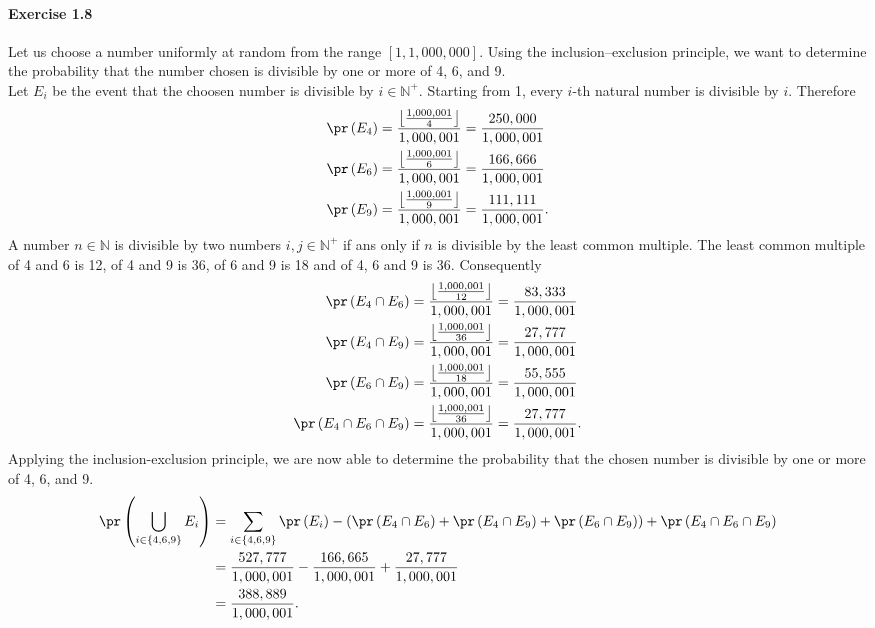 \paragraph{Exercise 1.8} Let us choose a number uniformly at random from the range
$[1, 1,000,000]$. Using the inclusion–exclusion principle, we want to determine
the probability that the number chosen is divisible by one or more of 4, 6, and 9. \\
Let $E_i$ be the event that the choosen number is divisible by $i\in \mathbb{N}^+$.
Starting from 1, every $i$-th natural number is divisible by $i$. Therefore
\begin{align*}
  \pr\left(E_4\right) &= \frac{\left\lfloor \frac{1,000,001}{4} \right\rfloor}{1,000,001} = \frac{250,000}{1,000,001} \\
  \pr\left(E_6\right) &= \frac{\left\lfloor \frac{1,000,001}{6} \right\rfloor}{1,000,001} = \frac{166,666}{1,000,001} \\
  \pr\left(E_9\right) &= \frac{\left\lfloor \frac{1,000,001}{9} \right\rfloor}{1,000,001} = \frac{111,111}{1,000,001}.
\end{align*}
A number $n \in \mathbb{N}$ is divisible by two numbers $i,j \in \mathbb{N}^+$
if ans only if $n$ is divisible by the least common multiple. The least
common multiple of 4 and 6 is 12, of 4 and 9 is 36, of 6 and 9 is 18 and of 4, 6
and 9 is 36. Consequently
\begin{align*}
  \pr\left(E_4 \cap E_6\right) &= \frac{\left\lfloor \frac{1,000,001}{12} \right\rfloor}{1,000,001} = \frac{83,333}{1,000,001} \\
  \pr\left(E_4 \cap E_9\right) &= \frac{\left\lfloor \frac{1,000,001}{36} \right\rfloor}{1,000,001} = \frac{27,777}{1,000,001} \\
  \pr\left(E_6 \cap E_9\right) &= \frac{\left\lfloor \frac{1,000,001}{18} \right\rfloor}{1,000,001} = \frac{55,555}{1,000,001} \\
  \pr\left(E_4 \cap E_6 \cap E_9\right) &= \frac{\left\lfloor \frac{1,000,001}{36} \right\rfloor}{1,000,001} = \frac{27,777}{1,000,001}.
\end{align*}
Applying the inclusion-exclusion principle, we are now able to determine the
probability that the chosen number is divisible by one or more of 4, 6, and 9.
\begin{align*}
  \pr\left(\bigcup_{i\in \{4,6,9\}}E_i\right)
    &= \sum_{i\in \{4,6,9\}} \pr\left(E_i\right) -
       \left(\pr\left(E_4 \cap E_6\right) + \pr\left(E_4 \cap E_9\right) + \pr\left(E_6 \cap E_9\right)\right) + \pr\left(E_4 \cap E_6 \cap E_9 \right) \\
    &= \frac{527,777}{1,000,001} - \frac{166,665}{1,000,001} + \frac{27,777}{1,000,001} \\
    &= \frac{388,889}{1,000,001}.
\end{align*}

